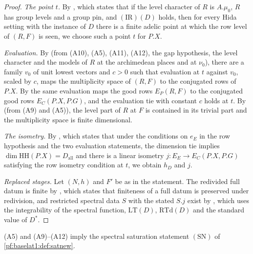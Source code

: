 \begin{proof}
\emph{The point $t$.} By , which states that if
the level character of $R$ is $A.\mu_0$, $R$ has group levels and a group pin, and $(\mathrm{IR})(D)$ holds, then for
every Hida setting with the instance of $D$ there is a finite adelic point at which the row level of $(R,F)$ is seen,
we choose such a point $t$ for $P.X$.

\emph{Evaluation.} By  (from (A10),
(A5), (A11), (A12), the gap hypothesis, the level character and the models of $R$ at the archimedean places and at
$\nu_0$), there are a family $v_0$ of unit lowest vectors and $c>0$ such that evaluation at $t$ against $v_0$, scaled
by $c$, maps the multiplicity space of $(R,F)$ to the conjugated rows of $P.X$. By
 the same evaluation maps the good rows $E_P(R,F)$
to the conjugated good rows $E_C(P.X,P.G)$, and the evaluation tie with constant $c$ holds at $t$. By
 (from (A9) and (A5)), the level
part of $R$ at $F$ is contained in its trivial part and the multiplicity space is finite dimensional.

\emph{The isometry.} By , which states that
under the conditions on $e_E$ in the row hypothesis and the two evaluation statements, the dimension tie implies
$\dim\mathrm{HH}(P.X)=D_{\mathrm{all}}$ and there is a linear isometry $j\colon E_E\to E_C(P.X,P.G)$ satisfying the row
isometry condition at $t$, we obtain $h_D$ and $j$.

\emph{Replaced stages.} Let $(N,h)$ and $F'$ be as in the statement. The redivided full datum is finite by
, which states that finiteness of a full datum is
preserved under redivision, and restricted spectral data $S$ with the stated $S.j$ exist by
, which uses the integrability of the spectral function,
$\mathrm{LT}(D)$, $\mathrm{RTd}(D)$ and the standard value of $D^*$.
\end{proof}

\begin{theorem}\label{pf:baselat1:satnewthm}
(A5) and (A9)--(A12) imply the spectral saturation statement $(\mathrm{SN})$ of \cref{pf:baselat1:def:satnew}.
\end{theorem}

